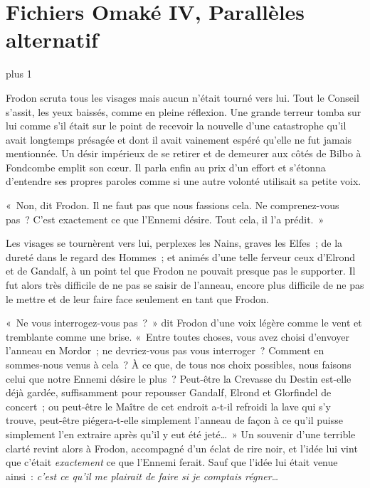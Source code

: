 
\makeatletter
\newcommand{\OmakeIVspecialsection}[2][1.5]{%
\vspace*{2\baselineskip plus 1\baselineskip minus 1\baselineskip}%
\noindent\hfill\scalebox{#1}{#2}\hfill\mbox{}%
\vskip 1\baselineskip plus 1\baselineskip%
\@afterindentfalse\@afterheading
}
\makeatother

\newcommand{\OmakeIVsection}[2][1.2]{%
  \OmakeIVspecialsection[#1]{\MakeUppercase{#2}}}

\chapter{Fichiers Omaké IV, Parallèles alternatif}

\OmakeIVspecialsection[1.6]{\fontspec[ExternalLocation]{RingBearer}
\settowidth{\versewidth}{\mbox{Le}}
Seigneur\scalebox{.40}{\parbox[b]{\versewidth}{%
        \centering de\\\nointerlineskip\vskip 4pt la}}Rationalit\raisebox{.2ex}{É}}

Frodon scruta tous les visages mais aucun n'était tourné vers lui.
Tout le Conseil s'assit, les yeux baissés, comme en pleine réflexion.
Une grande terreur tomba sur lui comme s'il était sur le point de recevoir la nouvelle d'une catastrophe qu'il avait longtemps présagée et dont il avait vainement espéré qu'elle ne fut jamais mentionnée.
Un désir impérieux de se retirer et de demeurer aux côtés de Bilbo à Fondcombe emplit son cœur.
Il parla enfin au prix d'un effort et s'étonna d'entendre ses propres paroles comme si une autre volonté utilisait sa petite voix.

«~Non, dit Frodon.
Il ne faut pas que nous fassions cela.
Ne comprenez-vous pas~?
C'est exactement ce que l'Ennemi désire.
Tout cela, il l'a prédit.~»

Les visages se tournèrent vers lui, perplexes les Nains, graves les Elfes~; de la dureté dans le regard des Hommes~; et animés d'une telle ferveur ceux d'Elrond et de Gandalf, à un point tel que Frodon ne pouvait presque pas le supporter.
Il fut alors très difficile de ne pas se saisir de l'anneau, encore plus difficile de ne pas le mettre et de leur faire face seulement en tant que Frodon.

«~Ne vous interrogez-vous pas~?~»
dit Frodon d'une voix légère comme le vent et tremblante comme une brise.
«~Entre toutes choses, vous avez choisi d'envoyer l'anneau en Mordor~; ne devriez-vous pas vous interroger~?
Comment en sommes-nous venus à cela~?
À ce que, de tous nos choix possibles, nous faisons celui que notre Ennemi désire le plus~?
Peut-être la Crevasse du Destin est-elle déjà gardée, suffisamment pour repousser Gandalf, Elrond et Glorfindel de concert~; ou peut-être le Maître de cet endroit a-t-il refroidi la lave qui s'y trouve, peut-être piégera-t-elle simplement l'anneau de façon à ce qu'il puisse simplement l'en extraire après qu'il y eut été jeté…~»
Un souvenir d'une terrible clarté revint alors à Frodon, accompagné d'un éclat de rire noir, et l'idée lui vint que c'était \emph{exactement} ce que l'Ennemi ferait.
Sauf que l'idée lui était venue ainsi~: \emph{c'est ce qu'il me plairait de faire si je comptais régner…}

